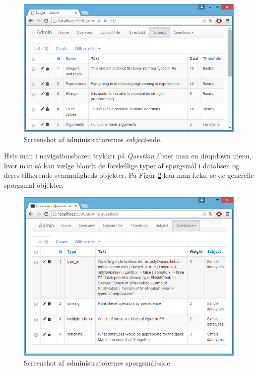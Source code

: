 \documentclass[11pt, a4paper]{article}
\begin{document}
\begin{figure}[htpb]
    \centering
    \includegraphics[width=1\linewidth]{figures/interface/admin_subject.png}
    \caption{Screenshot af administratorernes \emph{subject}-side.}
    \label{fig:screenshot_admin_subject}
\end{figure}

Hvis man i navigationsbaren trykker på \emph{Question} åbner man en dropdown menu, hvor man så kan vælge blandt de forskellige typer af spørgsmål i databsen og deres tilhørende svarmuligheds-objekter. På Figur \ref{fig:screenshot_admin_question} kan man f.eks. se de generelle spørgsmål objekter.

\begin{figure}[htpb]
    \centering
    \includegraphics[width=1\linewidth]{figures/interface/admin_question.png}
    \caption{Screenshot af administratorernes spørgsmål-side.}
    \label{fig:screenshot_admin_question}
\end{figure}
\end{document}
